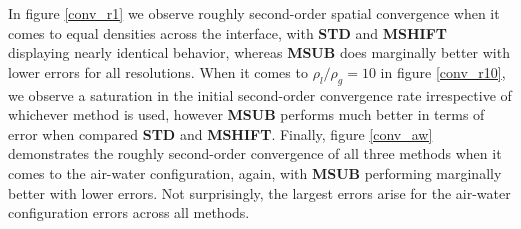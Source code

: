 In figure \ref{conv_r1} we observe roughly second-order spatial convergence when it comes to equal densities across the interface, with \textbf{STD} and \textbf{MSHIFT} displaying nearly identical behavior, whereas \textbf{MSUB} does marginally better with lower errors for all resolutions. When it comes to $\rho_l / \rho_g = 10$ in figure \ref{conv_r10}, we observe a saturation in the initial second-order convergence rate irrespective of whichever method is used, however \textbf{MSUB} performs much better in terms of error when compared \textbf{STD} and \textbf{MSHIFT}. Finally, figure \ref{conv_aw} demonstrates the roughly second-order convergence of all three methods when it comes to the air-water configuration, again, with \textbf{MSUB} performing marginally better with lower errors. Not surprisingly, the largest errors arise for the air-water configuration errors across all methods. 


